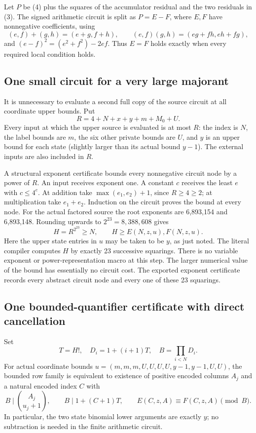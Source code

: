 Let $P$ be (4) plus the squares of the accumulator residual and the two
residuals in (3).  The signed arithmetic circuit is split as $P=E-F$,
where $E,F$ have nonnegative coefficients, using
\[
 (e,f)+(g,h)=(e+g,f+h),\qquad
 (e,f)(g,h)=(eg+fh,eh+fg),
\]
and $(e-f)^2=(e^2+f^2)-2ef$.  Thus $E=F$ holds exactly when every
required local condition holds.

\subsection{One small circuit for a very large majorant}

It is unnecessary to evaluate a second full copy of the source circuit at
all coordinate upper bounds.  Put
\[
 R=4+N+x+y+m+M_0+U.
\]
Every input at which the upper source is evaluated is at most $R$: the
index is $N$, the label bounds are $m$, the six other private bounds are
$U$, and $y$ is an upper bound for each state (slightly larger than its
actual bound $y-1$).  The external inputs are also included in $R$.

A structural exponent certificate bounds every nonnegative circuit node
by a power of $R$.  An input receives exponent one.  A constant $c$
receives the least $e$ with $c\le4^e$.  At addition take
$\max(e_1,e_2)+1$, since $R\ge4\ge2$; at multiplication take $e_1+e_2$.
Induction on the circuit proves the bound at every node.  For the actual
factored source the root exponents are 6,893,154 and 6,893,148.
Rounding upwards to $2^{23}=8,388,608$ gives
\[
 H=R^{2^{23}}\ge N,\qquad H\ge E(N,z,u),F(N,z,u). \tag{5}
\]
Here the upper state entries in $u$ may be taken to be $y$, as just noted.
The literal compiler computes $H$ by exactly 23 successive squarings.
There is no variable exponent or power-representation macro at this step.
The larger numerical value of the bound has essentially no circuit cost.
The exported exponent certificate records every abstract circuit node
and every one of these 23 squarings.

\subsection{One bounded-quantifier certificate with direct cancellation}

Set
\[
 T=H!,\quad D_i=1+(i+1)T,\quad B=\prod_{i<N}D_i.
\]
For actual coordinate bounds
$u=(m,m,m,U,U,U,U,y-1,y-1,U,U)$, the bounded row family is equivalent to
existence of positive encoded columns $A_j$ and a natural encoded index $C$
with
\[
 B\mid {A_j\choose u_j+1},\qquad
 B\mid1+(C+1)T,\qquad E(C,z,A)\equiv F(C,z,A)\pmod B. \tag{6}
\]
In particular, the two state binomial lower arguments are exactly $y$;
no subtraction is needed in the finite arithmetic circuit.

